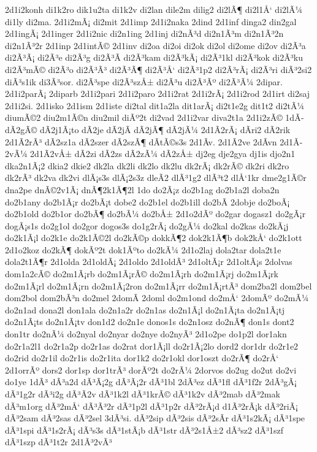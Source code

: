 {2d1i2konh
di1k2ro
dik1u2ta
di1k2v
di2lan
dile2m
dilig2
di2lÃ¶
di2l1Å‘
di2lÃ¼
di1ly
di2ma.
2d1i2mÃ¡
di2mit
2d1imp
2d1i2naka
2dind
2d1inf
dinga2
din2gal
2d1ingÃ¡
2d1inger
2d1i2nic
di2n1ing
2d1inj
di2nÃ³d
di2n1Ã³m
di2n1Ã³2n
di2n1Ã³2r
2d1inp
2d1intÃ©
2d1inv
di2oa
di2oi
di2ok
di2ol
di2ome
di2ov
di2Ã³a
di2Ã³Ã¡
di2Ã³e
di2Ã³g
di2Ã³Ã­
di2Ã³kam
di2Ã³kÃ¡
di2Ã³1kl
di2Ã³kok
di2Ã³ku
di2Ã³mÃ©
di2Ã³o
di2Ã³Ã³
di2Ã³Ã¶
di2Ã³Å‘
di2Ã³1p2
di2Ã³rÃ¡
di2Ã³ri
diÃ³2si2
diÃ³s1ik
di3Ã³sor.
di2Ã³spe
di2Ã³szÅ±
di2Ã³u
di2Ã³Ãº
di2Ã³Ã¼
2dipar.
2d1i2parÃ¡
2diparb
2d1i2pari
2d1i2paro
2d1i2rat
2d1i2rÃ¡
2d1i2rod
2d1irt
di2saj
2d1i2si.
2d1isko
2d1ism
2d1iste
di2tal
dit1a2la
dit1arÃ¡
di2t1e2g
dit1t2
di2tÃ¼
diumÃ©2
diu2m1Ã©n
diu2mil
diÃº2t
di2vad
2d1i2var
diva2t1a
2d1i2zÃ©
1dÃ­
dÃ­2gÃ©
dÃ­2j1Ã¡to
dÃ­2je
dÃ­2jÃ­
dÃ­2jÃ¶
dÃ­2jÃ¼
2d1Ã­2rÃ¡
dÃ­ri2
dÃ­2rik
2d1Ã­2rÃ³
dÃ­2sz1a
dÃ­2szer
dÃ­2szÃ¶
dÃ­tÃ©s3s
2d1Ã­v.
2d1Ã­2ve
2dÃ­vn
2d1Ã­2vÃ¼
2d1Ã­2vÅ±
dÃ­2zi
dÃ­2zs
dÃ­2zÃ¼
dÃ­2zÅ±
dj2eg
dje2gya
dj1is
djo2n1
dka2n1Ã¡2
dkia2
dkie2
dk2la
dk2li
dk2lo
dk2lu
dk2rÃ¡
dk2rÃ©
dk2ri
dk2ro
dk2rÃ³
dk2va
dk2vi
dlÃ¡s3s
dlÃ¡2s3z
dleÃ­2
dlÃ³1g2
dlÃ³t2
dlÅ‘1kr
dme2g1Ã©r
dna2pe
dnÃ©2v1Ã¡
dnÃ¶2k1Ã¶2l
1do
do2Ã¡z
do2b1ag
do2b1a2l
doba2n
do2b1any
do2b1Ã¡r
do2bÃ¡t
dobe2
do2b1el
do2b1ill
do2bÃ­
2dobje
do2boÃ¡
do2b1old
do2b1or
do2bÃ¶
do2bÃ¼
do2bÅ±
2d1o2dÃº
do2gar
dogasz1
do2gÃ¡r
dogÃ¡s1s
do2g1ol
do2gor
dogos3s
do1g2rÃ¡
do2gÃ¼
do2kal
do2kas
do2kÃ¡j
do2k1Ã¡l
do2k1e
do2k1Ã©2l
do2kÃ©p
dokkÃ¶2
dok2k1Ã¶b
dok2kÅ‘
do2k1ott
2d1o2koz
do2kÃ¶
dokÃº2t
dok1Ãºto
do2kÃ¼
2d1o2laj
dola2tar
dola2t1e
dola2t1Ã¶r
2d1olda
2d1oldÃ¡
2d1oldo
2d1oldÃ³
2d1oltÃ¡r
2d1oltÃ¡s
2dolvas
dom1a2cÃ©
do2m1Ã¡rb
do2m1Ã¡rÃ©
do2m1Ã¡rh
do2m1Ã¡rj
do2m1Ã¡rk
do2m1Ã¡rl
do2m1Ã¡rn
do2m1Ã¡2ron
do2m1Ã¡rr
do2m1Ã¡rtÃ³
dom2ba2l
dom2bel
dom2bol
dom2bÃ³n
do2mel
2domÃ­
2doml
do2m1ond
do2mÅ‘
2domÃº
do2mÃ¼
do2n1ad
dona2l
don1ala
do2n1a2r
do2n1as
do2n1Ã¡l
do2n1Ã¡ta
do2n1Ã¡tj
do2n1Ã¡ts
do2n1Ã¡tv
don1d2
do2n1e
donos1s
do2n1osz
do2nÃ¶
don1s
dont2
don1tr
do2nÃ¼
do2nyal
do2nyar
do2nye
do2nyÃ³
2d1o2pe
do1p2l
dor1akn
do2r1a2l1
do2r1a2p
do2r1as
do2rat
dor1Ã¡ll
do2r1Ã¡2lo
dord2
dor1dr
do2r1e2
do2rid
do2r1il
do2r1is
do2r1ita
dor1k2
do2r1okl
dor1oszt
do2rÃ¶
do2rÅ‘
2d1orrÃº
dors2
dor1sp
dor1trÃ³
dorÃº2t
do2rÃ¼
2dorvos
do2ug
do2ut
do2vi
do1ye
1dÃ³
dÃ³a2d
dÃ³Ã¡2g
dÃ³Ã¡2r
dÃ³1bl
2dÃ³ez
dÃ³1fl
dÃ³1f2r
2dÃ³gÃ¡
dÃ³1g2r
dÃ³i2g
dÃ³Ã­2v
dÃ³1k2l
dÃ³1krÃ©
dÃ³1k2v
dÃ³2mab
dÃ³2mak
dÃ³m1org
dÃ³2mÅ‘
dÃ³Ã³2r
dÃ³1p2l
dÃ³1p2r
dÃ³2rÃ¡d
d1Ã³2rÃ¡k
dÃ³2riÃ¡
dÃ³2sam
dÃ³2sas
dÃ³2sel
3dÃ³si.
dÃ³2sip
dÃ³2sis
dÃ³2sÃ­r
dÃ³1s2kÃ¡
dÃ³1spe
dÃ³1spi
dÃ³1s2rÃ¡
dÃ³s3s
dÃ³1stÃ¡b
dÃ³1str
dÃ³2s1Å±2
dÃ³sz2
dÃ³1szf
dÃ³1szp
dÃ³1t2r
2d1Ã³2vÃ³
}
